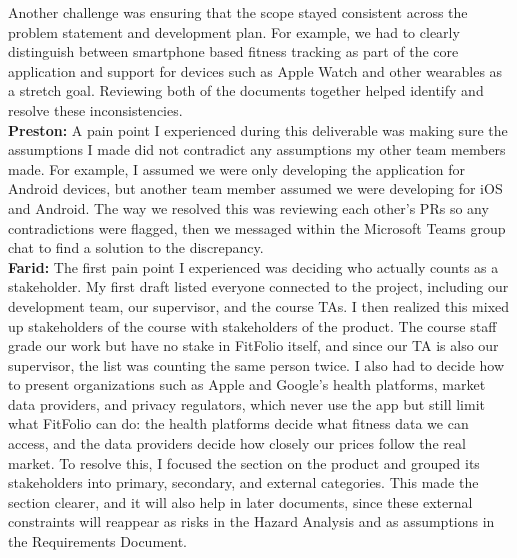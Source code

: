\documentclass{article}
\begin{document}
Another challenge was ensuring that the scope stayed consistent across the problem statement and development plan. For example, we had to clearly distinguish between smartphone based fitness tracking as part of the core application and support for devices such as Apple Watch and other wearables as a stretch goal. Reviewing both of the documents together helped identify and resolve these inconsistencies.
\newline \\
\textbf{Preston:} A pain point I experienced during this deliverable was making sure the assumptions I made did not contradict any assumptions my other team members made. For example, I assumed we were only developing the application for Android devices, but another team member assumed we were developing for iOS and Android. The way we resolved this was reviewing each other's PRs so any contradictions were flagged, then we messaged within the Microsoft Teams group chat to find a solution to the discrepancy. 
\newline \\
\textbf{Farid:} The first pain point I experienced was deciding who actually counts as a stakeholder. My first draft listed everyone connected to the project, including our development team, our supervisor, and the course TAs. I then realized this mixed up stakeholders of the course with stakeholders of the product. The course staff grade our work but have no stake in FitFolio itself, and since our TA is also our supervisor, the list was counting the same person twice. I also had to decide how to present organizations such as Apple and Google's health platforms, market data providers, and privacy regulators, which never use the app but still limit what FitFolio can do: the health platforms decide what fitness data we can access, and the data providers decide how closely our prices follow the real market.
To resolve this, I focused the section on the product and grouped its stakeholders into primary, secondary, and external categories. This made the section clearer, and it will also help in later documents, since these external constraints will reappear as risks in the Hazard Analysis and as assumptions in the Requirements Document.
    
\end{document}
